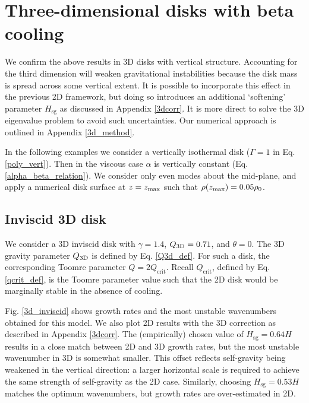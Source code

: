 \section{Three-dimensional disks with beta cooling}\label{3ddisk}
We confirm the above results in 3D disks with vertical
structure. Accounting for the third dimension will weaken gravitational instabilities
because the disk mass is spread across some vertical extent. It is 
possible to incorporate this effect in the previous 2D framework, but doing so
introduces an additional `softening' parameter $H_\mathrm{sg}$ as discussed in
Appendix \ref{3dcorr}. It is more direct to solve the 3D eigenvalue
problem to avoid such uncertainties. Our numerical approach is
outlined in Appendix \ref{3d_method}. 


In the following examples we consider a vertically isothermal disk
($\Gamma=1$ in Eq. \ref{poly_vert}). Then in the viscous case $\alpha$ is vertically
constant (Eq. \ref{alpha_beta_relation}). We consider only even modes
about the mid-plane, and apply a numerical disk surface at $z=z_\mathrm{max}$
such that $\rho(z_\mathrm{max})=0.05\rho_0$.     

\subsection{Inviscid 3D disk}

We consider a 3D inviscid disk with $\gamma=1.4$, $Q_\mathrm{3D}=0.71$, and $\theta=0$. 
The 3D gravity parameter $Q_\mathrm{3D}$ is defined by 
Eq. \ref{Q3d_def}. For such a disk, the corresponding Toomre parameter 
$Q=2Q_\mathrm{crit}$. Recall $Q_\mathrm{crit}$, defined by
Eq. \ref{qcrit_def}, is the Toomre parameter value such that the 2D
disk would be marginally stable in the absence of cooling. 

Fig. \ref{3d_inviscid} shows growth rates and the most unstable
wavenumbers obtained for this model. We also plot 2D
results with the 3D correction as described in Appendix
\ref{3dcorr}. The (empirically) chosen value of 
$H_\mathrm{sg}=0.64H$ results in a close match between 2D and 3D
growth rates, but the most unstable wavenumber in 3D is somewhat smaller. 
This offset reflects self-gravity being weakened in the vertical 
direction: a larger horizontal scale is required to achieve the same
strength of self-gravity as the 2D case. Similarly, 
choosing $H_\mathrm{sg}=0.53H$ matches the optimum wavenumbers, but
growth rates are over-estimated in 2D.    

